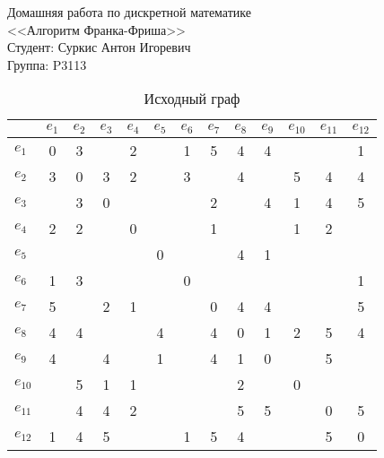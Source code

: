 \documentclass[a4paper,12pt]{article}
\begin{document}
\pagestyle{fancy}
\fancyfoot{}

\noindent
Домашняя работа по дискретной математике \\
<<Алгоритм Франка-Фриша>> \\
Студент: Суркис Антон Игоревич \\
Группа: P3113

\begin{table}[H]
    \centering
    \caption{Исходный граф}
    \begin{tabular}{l*{3}{|cccc}}
        &$e_{1}$&$e_{2}$&$e_{3}$&$e_{4}$&$e_{5}$&$e_{6}$&$e_{7}$&$e_{8}$&$e_{9}$&$e_{10}$&$e_{11}$&$e_{12}$\\
        \hline
        $e_{1}$&0&3&&2&&1&5&4&4&&&1\\
        $e_{2}$&3&0&3&2&&3&&4&&5&4&4\\
        $e_{3}$&&3&0&&&&2&&4&1&4&5\\
        $e_{4}$&2&2&&0&&&1&&&1&2&\\
        \hline
        $e_{5}$&&&&&0&&&4&1&&&\\
        $e_{6}$&1&3&&&&0&&&&&&1\\
        $e_{7}$&5&&2&1&&&0&4&4&&&5\\
        $e_{8}$&4&4&&&4&&4&0&1&2&5&4\\
        \hline
        $e_{9}$&4&&4&&1&&4&1&0&&5&\\
        $e_{10}$&&5&1&1&&&&2&&0&&\\
        $e_{11}$&&4&4&2&&&&5&5&&0&5\\
        $e_{12}$&1&4&5&&&1&5&4&&&5&0\\
    \end{tabular}
\end{table}
\end{document}
